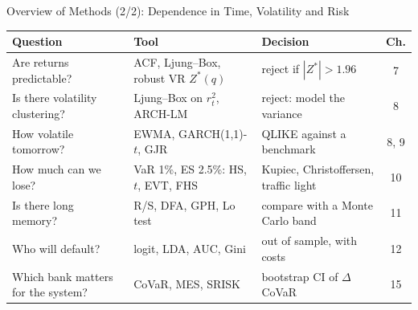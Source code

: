 \begin{frame}{Overview of Methods (2/2): Dependence in Time, Volatility and Risk}
\itemsize{\small}
\begin{center}
\footnotesize
\begin{tabular}{>{\raggedright\arraybackslash}p{3.6cm}>{\raggedright\arraybackslash}p{3.4cm}>{\raggedright\arraybackslash}p{3.4cm}c}
\toprule
\textbf{Question} & \textbf{Tool} & \textbf{Decision} & \textbf{Ch.} \\
\midrule
Are returns predictable? & ACF, Ljung--Box, robust VR $Z^*(q)$ & reject if $|Z^*| > 1.96$ & 7 \\
Is there volatility clustering? & Ljung--Box on $r_t^2$, ARCH-LM & reject: model the variance & 8 \\
How volatile tomorrow? & EWMA, GARCH(1,1)-$t$, GJR & QLIKE against a benchmark & 8, 9 \\
How much can we lose? & VaR 1\%, ES 2.5\%: HS, $t$, EVT, FHS & Kupiec, Christoffersen, traffic light & 10 \\
Is there long memory? & R/S, DFA, GPH, Lo test & compare with a Monte Carlo band & 11 \\
Who will default? & logit, LDA, AUC, Gini & out of sample, with costs & 12 \\
Which bank matters for the system? & CoVaR, MES, SRISK & bootstrap CI of $\Delta$CoVaR & 15 \\
\bottomrule
\end{tabular}
\end{center}
\end{frame}

